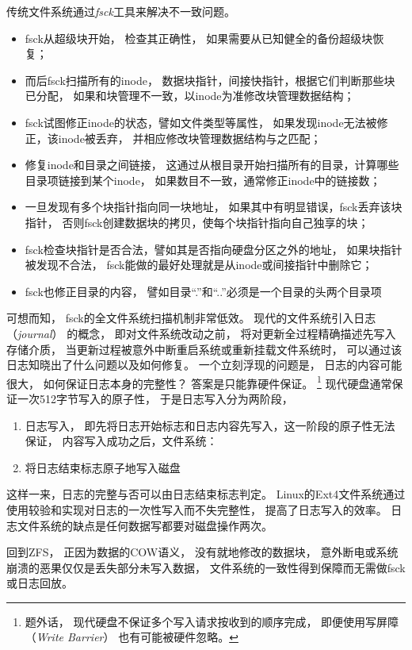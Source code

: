 传统文件系统通过{\em fsck}工具来解决不一致问题。
\begin{itemize}
  \item fsck从超级块开始，
    检查其正确性，
    如果需要从已知健全的备份超级块恢复；
  \item 而后fsck扫描所有的inode，
    数据块指针，间接快指针，根据它们判断那些块已分配，
    如果和块管理不一致，以inode为准修改块管理数据结构；
  \item fsck试图修正inode的状态，譬如文件类型等属性，
    如果发现inode无法被修正，该inode被丢弃，
    并相应修改块管理数据结构与之匹配；
  \item 修复inode和目录之间链接，
    这通过从根目录开始扫描所有的目录，计算哪些目录项链接到某个inode，
    如果数目不一致，通常修正inode中的链接数；
  \item 一旦发现有多个块指针指向同一块地址，
    如果其中有明显错误，fsck丢弃该块指针，
    否则fsck创建数据块的拷贝，使每个块指针指向自己独享的块；
  \item fsck检查块指针是否合法，譬如其是否指向硬盘分区之外的地址，
    如果块指针被发现不合法，
    fsck能做的最好处理就是从inode或间接指针中删除它；
  \item fsck也修正目录的内容，
    譬如目录``.''和``..''必须是一个目录的头两个目录项
\end{itemize}
可想而知，
fsck的全文件系统扫描机制非常低效。
现代的文件系统引入日志 （{\em journal}） 的概念，
即对文件系统改动之前，
将对更新全过程精确描述先写入存储介质，
当更新过程被意外中断重启系统或重新挂载文件系统时，
可以通过该日志知晓出了什么问题以及如何修复。
一个立刻浮现的问题是，
日志的内容可能很大，
如何保证日志本身的完整性？
答案是只能靠硬件保证。
\footnote{
  题外话，
  现代硬盘不保证多个写入请求按收到的顺序完成，
  即便使用写屏障（{\em Write Barrier}） 也有可能被硬件忽略。
}
现代硬盘通常保证一次512字节写入的原子性，
于是日志写入分为两阶段，
\begin{enumerate}
  \item 日志写入，
    即先将日志开始标志和日志内容先写入，这一阶段的原子性无法保证，
    内容写入成功之后，文件系统：
  \item 将日志结束标志原子地写入磁盘
\end{enumerate}
这样一来，日志的完整与否可以由日志结束标志判定。
Linux的Ext4文件系统通过使用较验和实现对日志的一次性写入而不失完整性，
提高了日志写入的效率。
日志文件系统的缺点是任何数据写都要对磁盘操作两次。

回到ZFS，
正因为数据的COW语义，
没有就地修改的数据块，
意外断电或系统崩溃的恶果仅仅是丢失部分未写入数据，
文件系统的一致性得到保障而无需做fsck或日志回放。

